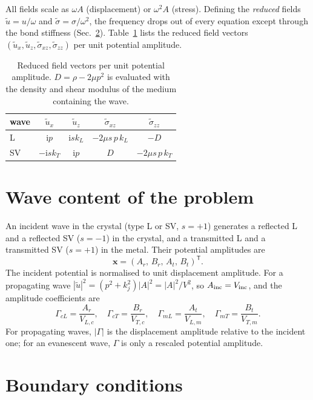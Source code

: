 \documentclass[11pt,a4paper]{article}
\newcommand{\ii}{\mathrm{i}}
\begin{document}
All fields scale as $\omega A$ (displacement) or $\omega^2A$ (stress). Defining the
\emph{reduced} fields $\tilde u=u/\omega$ and $\tilde\sigma=\sigma/\omega^2$, the frequency
drops out of every equation except through the bond stiffness (Sec.~\ref{app:BC}).
Table~\ref{tab:fields} lists the reduced field vectors
$(\tilde u_x,\tilde u_z,\tilde\sigma_{xz},\tilde\sigma_{zz})$ per unit potential amplitude.

\begin{table}[H]
\centering
\caption{Reduced field vectors per unit potential amplitude.
$D=\rho-2\mu p^2$ is evaluated with the density and shear modulus of the medium containing the wave.}
\label{tab:fields}
\begin{tabular}{lcccc}
\toprule
wave & $\tilde u_x$ & $\tilde u_z$ & $\tilde\sigma_{xz}$ & $\tilde\sigma_{zz}$\\
\midrule
L  & $\ii p$ & $\ii s k_L$ & $-2\mu s\,p\,k_L$ & $-D$\\
SV & $-\ii s k_T$ & $\ii p$ & $D$ & $-2\mu s\,p\,k_T$\\
\bottomrule
\end{tabular}
\end{table}

\section{Wave content of the problem}

An incident wave in the crystal (type L or SV, $s=+1$) generates a reflected L and a reflected
SV ($s=-1$) in the crystal, and a transmitted L and a transmitted SV ($s=+1$) in the metal.
Their potential amplitudes are
\begin{equation}
  \mathbf x=(A_{r},\,B_{r},\,A_{t},\,B_{t})^{\mathsf T}.
\end{equation}
The incident potential is normalised to unit displacement amplitude. For a propagating wave
$|\tilde u|^2=(p^2+k_j^2)|A|^2=|A|^2/V^2$, so $A_{\rm inc}=V_{\rm inc}$, and the amplitude
coefficients are
\begin{equation}
  \Gamma_{cL}=\frac{A_r}{V_{L,c}},\quad
  \Gamma_{cT}=\frac{B_r}{V_{T,c}},\quad
  \Gamma_{mL}=\frac{A_t}{V_{L,m}},\quad
  \Gamma_{mT}=\frac{B_t}{V_{T,m}} .
  \label{eq:Gamma}
\end{equation}
For propagating waves, $|\Gamma|$ is the displacement amplitude relative to the incident
one; for an evanescent wave, $\Gamma$ is only a rescaled potential amplitude.

\section{Boundary conditions}
\label{app:BC}
\end{document}
